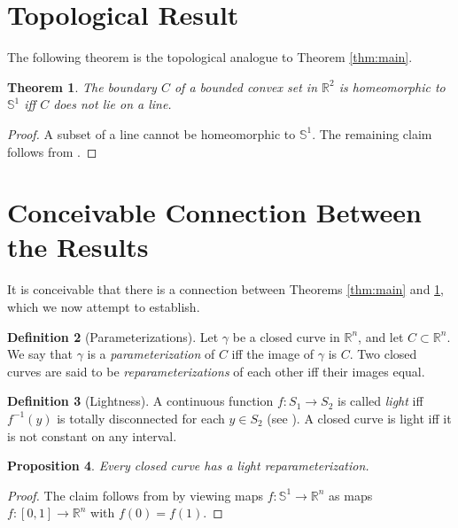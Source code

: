 \documentclass{amsart}
\newtheorem{proposition}{Proposition}[section]
\newtheorem{theorem}[proposition]{Theorem}
\theoremstyle{definition}
\newtheorem{definition}[proposition]{Definition}
\theoremstyle{remark}
\begin{document}
\section{Topological Result}

The following theorem is the topological analogue to Theorem \ref{thm:main}.

\begin{theorem}
    \label{thm:main_topo}
    The boundary $C$ of a bounded convex set in $\mathbb{R}^2$ is
    homeomorphic to $\mathbb{S}^1$ iff $C$ does not lie on a line.
\end{theorem}

\begin{proof}
    A subset of a line cannot be homeomorphic to $\mathbb{S}^1$.
    The remaining claim follows from \cite[Proposition 28 and Theorem 32]{lrs}.
\end{proof}

\section{Conceivable Connection Between the Results}
\label{sec:conceivable_connection}

It is conceivable that there is a connection between Theorems
\ref{thm:main} and \ref{thm:main_topo}, which we now attempt to establish.

\begin{definition}[Parameterizations]
    Let $\gamma$ be a closed curve in $\mathbb{R}^n$,
    and let $C\subset\mathbb{R}^n$.
    We say that $\gamma$ is a \emph{parameterization}
    of $C$ iff the image of $\gamma$ is $C$.
    Two closed curves are said to be
    \emph{reparameterizations} of each other
    iff their images equal.
\end{definition}

\begin{definition}[Lightness]
    A continuous function $f:S_1\to S_2$ is called \emph{light}
    iff $f^{-1}(y)$ is totally disconnected for each $y\in S_2$
    (see \cite[Definition 13.1]{nadler}). A closed curve
    is light iff it is not constant on any interval.
\end{definition}

\begin{proposition}
    \label{pro:light_repar}
    Every closed curve has a light reparameterization.
\end{proposition}

\begin{proof}
    The claim follows from \cite[Corollary 13.4]{nadler}
    by viewing maps $f:\mathbb{S}^1\to\mathbb{R}^n$
    as maps $f:[0,1]\to\mathbb{R}^n$ with $f(0)=f(1)$.
\end{proof}
\end{document}
